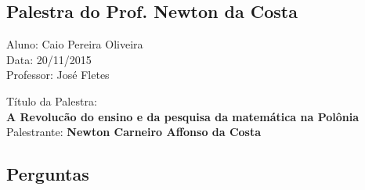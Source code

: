 \documentclass{article}
\begin{document}
\begin{center}
\section*{Palestra do Prof. Newton da Costa}
\begin{center}
Aluno: Caio Pereira Oliveira
\\Data: 20/11/2015
\\Professor: José Fletes
\end{center}

\begin{center}
Título da Palestra: \\ {\bf A Revolucão do ensino e da pesquisa da matemática na Polônia}
Palestrante: {\bf Newton Carneiro Affonso da Costa}
\end{center}

\subsection*{Perguntas}

\end{center}
\end{document}
